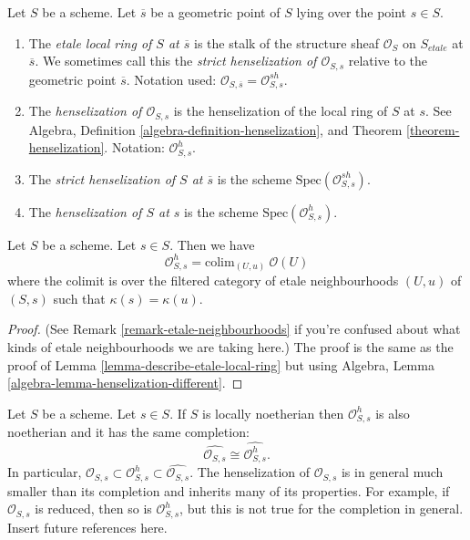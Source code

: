 \begin{definition}
\label{definition-etale-local-rings}
Let $S$ be a scheme. Let $\overline{s}$ be a geometric point of $S$
lying over the point $s \in S$.
\begin{enumerate}
\item The {\it etale local ring of $S$ at $\overline{s}$}
is the stalk of the structure sheaf $\mathcal{O}_S$ on $S_{etale}$
at $\overline{s}$. We sometimes call this the
{\it strict henselization of $\mathcal{O}_{S, s}$} relative
to the geometric point $\overline{s}$.
Notation used:
$\mathcal{O}_{S, \overline{s}} = \mathcal{O}_{S, s}^{sh}$.
\item The {\it henselization of $\mathcal{O}_{S, s}$} is the
henselization of the local ring of $S$ at $s$. See
Algebra, Definition \ref{algebra-definition-henselization},
and
Theorem \ref{theorem-henselization}.
Notation: $\mathcal{O}_{S, s}^h$.
\item The {\it strict henselization of $S$ at $\overline{s}$}
is the scheme $\text{Spec}(\mathcal{O}_{S, s}^{sh})$.
\item The {\it henselization of $S$ at $s$} is the scheme
$\text{Spec}(\mathcal{O}_{S, s}^h)$.
\end{enumerate}
\end{definition}

\begin{lemma}
\label{lemma-describe-henselization}
Let $S$ be a scheme. Let $s \in S$. Then we have
$$
\mathcal{O}_{S, s}^h =
\text{colim}_{(U, u)}\ \mathcal{O}(U)
$$
where the colimit is over the filtered category of
etale neighbourhoods $(U, u)$ of $(S, s)$ such that
$\kappa(s) = \kappa(u)$.
\end{lemma}

\begin{proof}
(See
Remark \ref{remark-etale-neighbourhoods}
if you're confused about what kinds of
etale neighbourhoods we are taking here.)
The proof is the same as the proof of
Lemma \ref{lemma-describe-etale-local-ring}
but using
Algebra, Lemma \ref{algebra-lemma-henselization-different}.
\end{proof}

\begin{remark}
\label{remark-henselization-Noetherian}
Let $S$ be a scheme. Let $s \in S$.
If $S$ is locally noetherian then $\mathcal{O}_{S, s}^h$
is also noetherian and it has the same completion:
$$
\widehat{\mathcal{O}_{S, s}} \cong \widehat{\mathcal{O}_{S, s}^h}.
$$
In particular,
$\mathcal{O}_{S, s} \subset
\mathcal{O}_{S, s}^h \subset
\widehat{\mathcal{O}_{S, s}}$.
The henselization of $\mathcal{O}_{S, s}$ is in general much
smaller than its completion and inherits many of its properties.
For example, if $\mathcal{O}_{S, s}$ is reduced, then so is
$\mathcal{O}_{S, s}^h$, but this is not true for the completion in general.
Insert future references here.
\end{remark}

